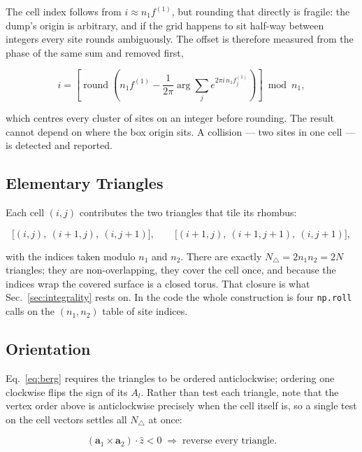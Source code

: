 \documentclass[12pt, a4paper, oneside]{article}
\newcommand{\avec}{\mathbf{a}}
\newcommand{\Na}{N}
\newcommand{\Ntri}{N_\triangle}
\begin{document}
The cell index follows from $i \approx n_1 f^{(1)}$, but rounding that directly
is fragile: the dump's origin is arbitrary, and if the grid happens to sit
half-way between integers every site rounds ambiguously. The offset is
therefore measured from the phase of the same sum and removed first,

\begin{equation}
\boxed{
    i = \left[\operatorname{round}\!\left(n_1 f^{(1)}
        - \frac{1}{2\pi}\arg\sum_j e^{2\pi i\,n_1 f^{(1)}_j}\right)\right]
        \bmod n_1 ,
}
\end{equation}

which centres every cluster of sites on an integer before rounding. The result
cannot depend on where the box origin sits. A collision --- two sites in one
cell --- is detected and reported.

\subsection{Elementary Triangles}

Each cell $(i,j)$ contributes the two triangles that tile its rhombus:

\begin{equation}
    \bigl[(i,j),\ (i{+}1,j),\ (i,j{+}1)\bigr],
    \qquad
    \bigl[(i{+}1,j),\ (i{+}1,j{+}1),\ (i,j{+}1)\bigr],
\end{equation}

with the indices taken modulo $n_1$ and $n_2$. There are exactly
$\Ntri = 2n_1n_2 = 2\Na$ triangles; they are non-overlapping, they cover the
cell once, and because the indices wrap the covered surface is a closed torus.
That closure is what Sec.~\ref{sec:integrality} rests on. In the code the whole
construction is four \texttt{np.roll} calls on the $(n_1,n_2)$ table of site
indices.

\subsection{Orientation}

Eq.~\eqref{eq:berg} requires the triangles to be ordered anticlockwise; ordering
one clockwise flips the sign of its $A_l$. Rather than test each triangle, note
that the vertex order above is anticlockwise precisely when the cell itself is,
so a single test on the cell vectors settles all $\Ntri$ at once:

\begin{equation}
    (\avec_1\times\avec_2)\cdot\hat z < 0
    \;\Longrightarrow\;
    \text{reverse every triangle.}
\end{equation}
\end{document}
